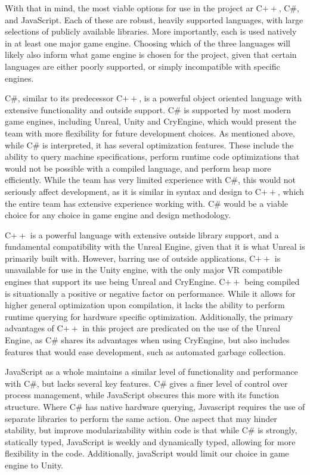\documentclass[onecolumn, draftclsnofoot,10pt, compsoc]{IEEEtran}
\newcounter{threesection}[subsubsection]
\newcounter{foursection}[threesection]
\begin{document}
With that in mind, the most viable options for use in the project ar C$++$, C\#, and JavaScript. Each of these are robust, heavily supported languages, with large selections of publicly available libraries. More importantly, each is used natively in at least one major game engine. Choosing which of the three languages will likely also inform what game engine is chosen for the project, given that certain languages are either poorly supported, or simply incompatible with specific engines.

C\#, similar to its predecessor C$++$, is a powerful object oriented language with extensive functionality and outside support. C\# is supported by most modern game engines, including Unreal, Unity and CryEngine, which would present the team with more flexibility for future development choices. As mentioned above, while C\# is interpreted, it has several optimization features. These include the ability to query machine specifications, perform runtime code optimizations that would not be possible with a compiled language, and perform heap more efficiently. While the team has very limited experience with C\#, this would not seriously affect development, as it is similar in syntax and design to C$++$, which the entire team has extensive experience working with. C\# would be a viable choice for any choice in game engine and design methodology.\cite{1}\cite{2}

C$++$ is a powerful language with extensive outside library support, and a fundamental compatibility with the Unreal Engine, given that it is what Unreal is primarily built with. However, barring use of outside applications, C$++$ is unavailable for use in the Unity engine, with the only major VR compatible engines that support its use being Unreal and CryEngine. C$++$ being compiled is situationally a positive or negative factor on performance. While it allows for higher general optimization upon compilation, it lacks the ability to perform runtime querying for hardware specific optimization. Additionally, the primary advantages of C$++$ in this project are predicated on the use of the Unreal Engine, as C\# shares its advantages when using CryEngine, but also includes features that would ease development, such as automated garbage collection.\cite{3}

JavaScript as a whole maintains a similar level of functionality and performance with C\#, but lacks several key features. C\# gives a finer level of control over process management, while JavaScript obscures this more with its function structure. Where C\# has native hardware querying, Javascript requires the use of separate libraries to perform the same action. One aspect that may hinder stability, but improve modularizability within code is that while C\# is strongly, statically typed, JavaScript is weekly and dynamically typed, allowing for more flexibility in the code. Additionally, javaScript would limit our choice in game engine to Unity.
\end{document}
